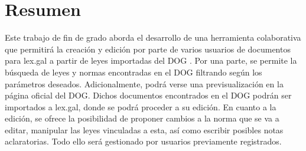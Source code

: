 \pagestyle{plain}
\chapter*{Resumen}
Este trabajo de fin de grado aborda el desarrollo de una herramienta colaborativa que permitirá la creación y edición por parte de varios usuarios de documentos para lex.gal \cite{lexgal} a partir de leyes importadas del DOG \cite{dog}. Por una parte, se permite la búsqueda de leyes y normas encontradas en el DOG filtrando según los parámetros deseados. Adicionalmente, podrá verse una previsualización en la página oficial del DOG. Dichos documentos encontrados en el DOG podrán ser importados a lex.gal, donde se podrá proceder a su edición. En cuanto a la edición, se ofrece la posibilidad de proponer cambios a la norma que se va a editar, manipular las leyes vinculadas a esta, así como escribir posibles notas aclaratorias. Todo ello será gestionado por usuarios previamente registrados.
